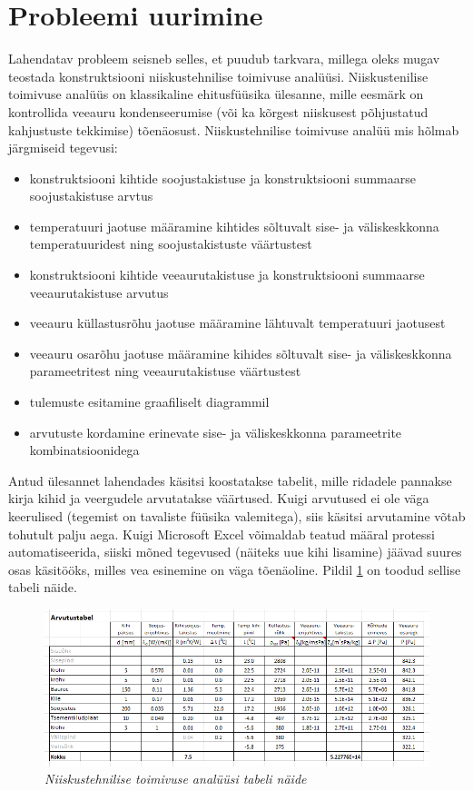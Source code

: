 


\section{Probleemi uurimine}
Lahendatav probleem seisneb selles, et puudub tarkvara, millega oleks mugav teostada konstruktsiooni niiskustehnilise toimivuse analüüsi. Niiskustenilise toimivuse analüüs
on klassikaline ehitusfüüsika ülesanne, mille eesmärk on kontrollida veeauru kondenseerumise (või ka kõrgest niiskusest põhjustatud kahjustuste tekkimise) tõenäosust.
Niiskustehnilise toimivuse analüü mis hõlmab järgmiseid tegevusi:
\begin{itemize}
    \item konstruktsiooni kihtide soojustakistuse ja konstruktsiooni summaarse soojustakistuse arvtus
    \item temperatuuri jaotuse määramine kihtides sõltuvalt sise- ja väliskeskkonna temperatuuridest ning soojustakistuste väärtustest
    \item konstruktsiooni kihtide veeaurutakistuse ja konstruktsiooni summaarse veeaurutakistuse arvutus
    \item veeauru küllastusrõhu jaotuse määramine lähtuvalt temperatuuri jaotusest
    \item veeauru osarõhu jaotuse määramine kihides sõltuvalt sise- ja väliskeskkonna parameetritest ning veeaurutakistuse väärtustest
    \item tulemuste esitamine graafiliselt diagrammil
    \item arvutuste kordamine erinevate sise- ja väliskeskkonna parameetrite kombinatsioonidega
\end{itemize}

Antud ülesannet lahendades käsitsi koostatakse tabelit, mille ridadele pannakse kirja kihid ja veergudele arvutatakse väärtused. Kuigi arvutused ei ole väga 
keerulised (tegemist on tavaliste füüsika valemitega), siis käsitsi arvutamine võtab tohutult palju aega. Kuigi Microsoft Excel võimaldab teatud määral
protessi automatiseerida, siiski mõned tegevused (näiteks uue kihi lisamine) jäävad suures osas käsitööks, milles vea esinemine on väga tõenäoline. 
Pildil \ref{fig:excel_table_sample} on toodud sellise tabeli näide.
\begin{figure}[ht]
    \centering
    \includegraphics[width=.8\textwidth]{figures/01_analogues/04_calc_table.png}
    \caption{\textit{Niiskustehnilise toimivuse analüüsi tabeli näide}}
    \label{fig:excel_table_sample}
\end{figure}

